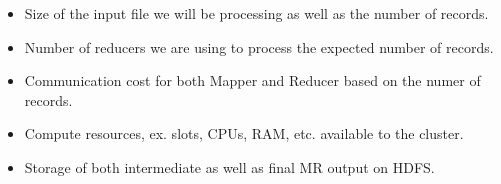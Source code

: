 \documentclass{article}
\begin{document}
\begin{itemize}
\begin{itemize}
\begin{itemize}
		\item Size of the input file we will be processing as well as the number of records.
		\item Number of reducers we are using to process the expected number of records.
		\item Communication cost for both Mapper and Reducer based on the numer of records.
		\item Compute resources, ex. slots, CPUs, RAM, etc. available to the cluster.
		\item Storage of both intermediate as well as final MR output on HDFS.\\
		\end{itemize}
	

\end{itemize}
\end{itemize}
\end{document}
